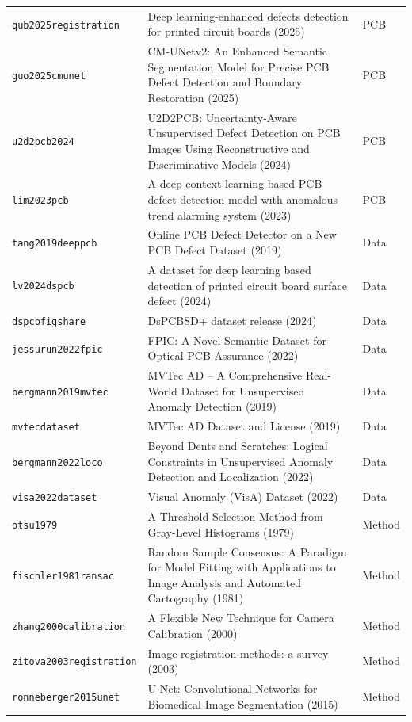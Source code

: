 \begin{longtable}{>{\raggedright\arraybackslash}p{}>{\raggedright\arraybackslash}p{}>{\raggedright\arraybackslash}p{}}
\texttt{qub2025registration} & Deep learning-enhanced defects detection for printed circuit boards (2025) & PCB \\
\texttt{guo2025cmunet} & CM-UNetv2: An Enhanced Semantic Segmentation Model for Precise PCB Defect Detection and Boundary Restoration (2025) & PCB \\
\texttt{u2d2pcb2024} & U2D2PCB: Uncertainty-Aware Unsupervised Defect Detection on PCB Images Using Reconstructive and Discriminative Models (2024) & PCB \\
\texttt{lim2023pcb} & A deep context learning based PCB defect detection model with anomalous trend alarming system (2023) & PCB \\
\texttt{tang2019deeppcb} & Online PCB Defect Detector on a New PCB Defect Dataset (2019) & Data \\
\texttt{lv2024dspcb} & A dataset for deep learning based detection of printed circuit board surface defect (2024) & Data \\
\texttt{dspcbfigshare} & DsPCBSD+ dataset release (2024) & Data \\
\texttt{jessurun2022fpic} & FPIC: A Novel Semantic Dataset for Optical PCB Assurance (2022) & Data \\
\texttt{bergmann2019mvtec} & MVTec AD -- A Comprehensive Real-World Dataset for Unsupervised Anomaly Detection (2019) & Data \\
\texttt{mvtecdataset} & MVTec AD Dataset and License (2019) & Data \\
\texttt{bergmann2022loco} & Beyond Dents and Scratches: Logical Constraints in Unsupervised Anomaly Detection and Localization (2022) & Data \\
\texttt{visa2022dataset} & Visual Anomaly (VisA) Dataset (2022) & Data \\
\texttt{otsu1979} & A Threshold Selection Method from Gray-Level Histograms (1979) & Method \\
\texttt{fischler1981ransac} & Random Sample Consensus: A Paradigm for Model Fitting with Applications to Image Analysis and Automated Cartography (1981) & Method \\
\texttt{zhang2000calibration} & A Flexible New Technique for Camera Calibration (2000) & Method \\
\texttt{zitova2003registration} & Image registration methods: a survey (2003) & Method \\
\texttt{ronneberger2015unet} & U-Net: Convolutional Networks for Biomedical Image Segmentation (2015) & Method \\

\end{longtable}
